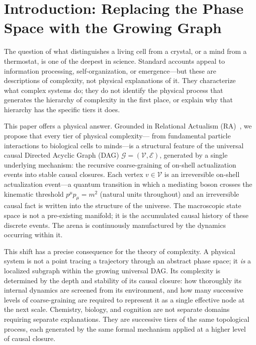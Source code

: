 \documentclass[11pt,a4paper]{article}
\theoremstyle{remark}
\newcommand{\GG}{\mathcal{G}}
\newcommand{\VV}{\mathcal{V}}
\newcommand{\EE}{\mathcal{E}}
\begin{document}
\section{Introduction: Replacing the Phase Space with the Growing Graph}
\label{sec:intro}

The question of what distinguishes a living cell from a crystal, or a mind from
a thermostat, is one of the deepest in science. Standard accounts appeal to
information processing, self-organization, or emergence---but these are
descriptions of complexity, not physical explanations of it. They characterize
what complex systems do; they do not identify the physical process that generates
the hierarchy of complexity in the first place, or explain why that hierarchy has
the specific tiers it does.

This paper offers a physical answer. Grounded in Relational Actualism
(RA)~\citep{Sandeman2026a}, we propose that every tier of physical complexity---
from fundamental particle interactions to biological cells to minds---is a
structural feature of the universal causal Directed Acyclic Graph (DAG)
$\GG = (\VV, \EE)$, generated by a single underlying mechanism: the recursive
coarse-graining of on-shell actualization events into stable causal closures.
Each vertex $v \in \VV$ is an irreversible on-shell actualization event---a
quantum transition in which a mediating boson crosses the kinematic threshold
$p^{\mu}p_{\mu} = m^2$ (natural units throughout) and an irreversible causal
fact is written into the structure of the universe. The macroscopic state space
is not a pre-existing manifold; it is the accumulated causal history of these
discrete events. The arena is continuously manufactured by the dynamics
occurring within it.

This shift has a precise consequence for the theory of complexity. A physical
system is not a point tracing a trajectory through an abstract phase space; it
\emph{is} a localized subgraph within the growing universal DAG. Its complexity
is determined by the depth and stability of its causal closure: how thoroughly
its internal dynamics are screened from its environment, and how many successive
levels of coarse-graining are required to represent it as a single effective node
at the next scale. Chemistry, biology, and cognition are not separate domains
requiring separate explanations. They are successive tiers of the same topological
process, each generated by the same formal mechanism applied at a higher level of
causal closure.
\end{document}
